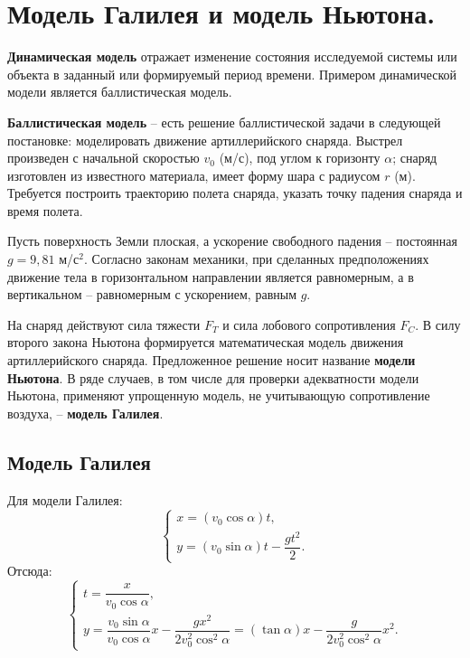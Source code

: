 \section{Модель Галилея и модель Ньютона.}

\textbf{Динамическая модель} отражает изменение состояния исследуемой
системы или объекта в заданный или формируемый период времени. Примером
динамической модели является баллистическая модель.

\textbf{Баллистическая модель} -- есть решение баллистической задачи в
следующей постановке: моделировать движение артиллерийского снаряда.
Выстрел произведен с начальной скоростью $v_0$ (м/с), под углом к горизонту
$\alpha$; снаряд изготовлен из известного материала, имеет форму шара с
радиусом $r$ (м). Требуется построить траекторию полета снаряда, указать
точку падения снаряда и время полета.

Пусть поверхность Земли плоская, а ускорение свободного падения -- постоянная
$g = 9{,}81$ м/с$^2$. Согласно законам механики, при сделанных
предположениях движение тела в горизонтальном направлении является
равномерным, а в вертикальном -- равномерным с ускорением, равным $g$.

На снаряд действуют сила тяжести $F_T$ и сила лобового сопротивления $F_C$.
В силу второго закона Ньютона формируется математическая модель движения
артиллерийского снаряда. Предложенное решение носит название
\textbf{модели Ньютона}. В ряде случаев, в том числе для проверки адекватности
модели Ньютона, применяют упрощенную модель, не учитывающую сопротивление
воздуха, -- \textbf{модель Галилея}.

\subsection*{Модель Галилея}

Для модели Галилея:
\[
\begin{cases}
  x = (v_0 \cos \alpha)t,\\
  y = (v_0 \sin \alpha)t - \dfrac{gt^2}{2}.
\end{cases}
\]
Отсюда:
\[
\begin{cases}
  t = \dfrac{x}{v_0\cos\alpha},\\
  y = \dfrac{v_0\sin\alpha}{v_0\cos\alpha}x
      - \dfrac{gx^2}{2v_0^2\cos^2\alpha}
    = (\tan\alpha)x - \dfrac{g}{2v_0^2\cos^2\alpha}x^2.
\end{cases}
\]

